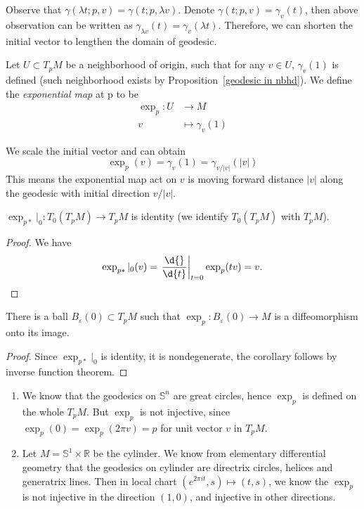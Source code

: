 Observe that $\gamma(\lambda t;p,v)=\gamma(t;p,\lambda v)$.
Denote $\gamma(t;p,v)=\gamma_v(t)$, then above observation can be written as $\gamma_{\lambda v}(t)=\gamma_v(\lambda t)$.
Therefore, we can shorten the initial vector to lengthen the domain of geodesic.

\begin{defn}
    Let $U\subset T_pM$ be a neighborhood of origin, such that for any $v\in U$, $\gamma_v(1)$ is defined (such neighborhood exists by Proposition~\ref{geodesic in nbhd}).
    We define the \emph{exponential map} at p to be
    \begin{align*}
        \exp_p:U&\to M\\
        v&\mapsto\gamma_v(1)
    \end{align*}
\end{defn}

\begin{rem}
    We scale the initial vector and can obtain
    \[\exp_p(v)=\gamma_v(1)=\gamma_{v/|v|}(|v|)\]
    This means the exponential map act on $v$ is moving forward distance $|v|$ along the geodesic with initial direction $v/|v|$.
\end{rem}

\begin{prop}
    $\exp_{p*}|_0:T_0(T_pM)\to T_pM$ is identity (we identify $T_0(T_pM)$ with $T_pM$).
\end{prop}
\begin{proof}
    We have
    \[\exp_{p*}|_0(v)=\left.\frac{\d{}}{\d{t}}\right|_{t=0}\exp_p(tv)=v.\qedhere\]
\end{proof}

\begin{cor}
    There is a ball $B_\varepsilon(0)\subset T_pM$ such that $\exp_p:B_\varepsilon(0)\to M$ is a diffeomorphism onto its image.
\end{cor}
\begin{proof}
    Since $\exp_{p*}|_0$ is identity, it is nondegenerate, the corollary follows by inverse function theorem.
\end{proof}

\begin{eg}
    \begin{enumerate}[(1)]
        \item We know that the geodesics on $\mathbb{S}^n$ are great circles, hence $\exp_p$ is defined on the whole $T_pM$.
        But $\exp_p$ is not injective, since $\exp_p(0)=\exp_p(2\pi v)=p$ for unit vector $v$ in $T_pM$.
        \item Let $M=\mathbb{S}^1\times\mathbb{R}$ be the cylinder.
        We know from elementary differential geometry that the geodesics on cylinder are directrix circles, helices and generatrix lines.
        Then in local chart $(e^{2\pi it},s)\mapsto(t,s)$, we know the $\exp_p$ is not injective in the direction $(1,0)$, and injective in other directions.
    \end{enumerate}
\end{eg}

